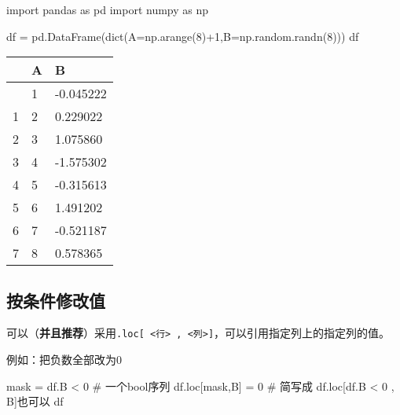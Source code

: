 \documentclass[
  letterpaper,
  DIV=11,
  numbers=noendperiod]{scrreprt}
\newenvironment{Shaded}{\begin{snugshade}}{\end{snugshade}}
\newcommand{\BuiltInTok}[1]{\textcolor[rgb]{0.00,0.23,0.31}{#1}}
\newcommand{\CommentTok}[1]{\textcolor[rgb]{0.37,0.37,0.37}{#1}}
\newcommand{\DecValTok}[1]{\textcolor[rgb]{0.68,0.00,0.00}{#1}}
\newcommand{\ImportTok}[1]{\textcolor[rgb]{0.00,0.46,0.62}{#1}}
\newcommand{\NormalTok}[1]{\textcolor[rgb]{0.00,0.23,0.31}{#1}}
\newcommand{\OperatorTok}[1]{\textcolor[rgb]{0.37,0.37,0.37}{#1}}
\newcommand{\StringTok}[1]{\textcolor[rgb]{0.13,0.47,0.30}{#1}}
\begin{document}
\begin{Shaded}
\begin{Highlighting}[]
\ImportTok{import}\NormalTok{ pandas }\ImportTok{as}\NormalTok{ pd}
\ImportTok{import}\NormalTok{ numpy }\ImportTok{as}\NormalTok{ np}

\NormalTok{df }\OperatorTok{=}\NormalTok{ pd.DataFrame(}\BuiltInTok{dict}\NormalTok{(A}\OperatorTok{=}\NormalTok{np.arange(}\DecValTok{8}\NormalTok{)}\OperatorTok{+}\DecValTok{1}\NormalTok{,B}\OperatorTok{=}\NormalTok{np.random.randn(}\DecValTok{8}\NormalTok{)))}
\NormalTok{df}
\end{Highlighting}
\end{Shaded}

\begin{longtable}[]{@{}lll@{}}
\toprule\noalign{}
& A & B \\
\midrule\noalign{}
\endhead
\bottomrule\noalign{}
\endlastfoot
0 & 1 & -0.045222 \\
1 & 2 & 0.229022 \\
2 & 3 & 1.075860 \\
3 & 4 & -1.575302 \\
4 & 5 & -0.315613 \\
5 & 6 & 1.491202 \\
6 & 7 & -0.521187 \\
7 & 8 & 0.578365 \\
\end{longtable}

\hypertarget{ux6309ux6761ux4ef6ux4feeux6539ux503c}{%
\subsection{按条件修改值}\label{ux6309ux6761ux4ef6ux4feeux6539ux503c}}

可以（\textbf{并且推荐}）采用\texttt{.loc{[}\ \textless{}行\textgreater{}\ ,\ \textless{}列\textgreater{}{]}}，可以引用指定列上的指定列的值。

例如：把负数全部改为0

\begin{Shaded}
\begin{Highlighting}[]
\NormalTok{mask }\OperatorTok{=}\NormalTok{ df.B }\OperatorTok{\textless{}} \DecValTok{0} \CommentTok{\# 一个bool序列}
\NormalTok{df.loc[mask,}\StringTok{\textquotesingle{}B\textquotesingle{}}\NormalTok{] }\OperatorTok{=} \DecValTok{0} \CommentTok{\# 简写成 df.loc[df.B \textless{} 0 , \textquotesingle{}B\textquotesingle{}]也可以}
\NormalTok{df}
\end{Highlighting}
\end{Shaded}
\end{document}
